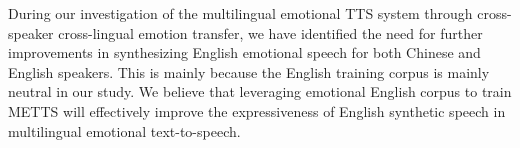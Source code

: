 \documentclass[journal,comsoc]{IEEEtran}
\begin{document}
During our investigation of the multilingual emotional TTS system through cross-speaker cross-lingual emotion transfer, we have identified the need for further improvements in synthesizing English emotional speech for both Chinese and English speakers. This is mainly because the English training corpus is mainly neutral in our study. We believe that leveraging emotional English corpus to train METTS will effectively improve the expressiveness of English synthetic speech in multilingual emotional text-to-speech.



%


\end{document}
